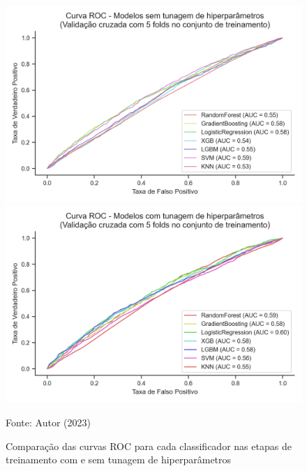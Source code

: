\begin{figure}[htb]
	\centering
	\caption{\label{img:curvasRocComTunagem}Comparação das curvas ROC para cada classificador nas etapas de treinamento com e sem tunagem de hiperparâmetros}
	
	\begin{minipage}[t]{0.45\textwidth}
		\centering
		\includegraphics[width=\textwidth]{USPSC-img/curva_roc_modelos_sem_tunagem_hiperparametros.png}
	\end{minipage}
	\hfill
	\begin{minipage}[t]{0.45\textwidth}
		\centering
		\includegraphics[width=\textwidth]{USPSC-img/curva_roc_modelos_com_tunagem_hiperparametros.png}
	\end{minipage}
	
	\begin{center}
		Fonte: Autor (2023)
	\end{center}
\end{figure}

